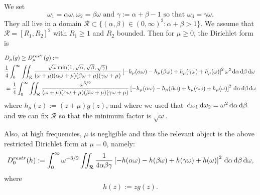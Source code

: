 \documentclass[reqno,11pt,letterpaper]{amsart}
\numberwithin{equation}{section}
\newcommand{\dd}{\, {\rm d}}
\begin{document}
We set $$\omega_1=\alpha \omega, \omega_2=\beta \omega \text{ and } \gamma:=\alpha+\beta-1 \text{ so that } \omega_3=\gamma \omega.$$  They all live in a domain  $\mathcal{R} \subset \{(\alpha,\beta) \in (0,\infty)^2: \alpha+\beta>1\}$. We assume that $\mathcal{R} = [R_1,R_2]^2$ with $R_1\geq 1$ and $R_2$ bounded. 
Then for $\mu\geq 0$, the Dirichlet form is 

\begin{equation}
    \begin{split}
    &D_\mu(g) \geq  D_\mu^{restr}(g) := \\
    & \frac{1}{4} \int_0^\infty \iint_{\mathcal{R}} \frac{\sqrt{\omega} \min(1,\sqrt{\alpha}, \sqrt{\beta},\sqrt{\gamma}) }{(\omega+\mu)(\alpha\omega+\mu)(\beta\omega+\mu)(\gamma\omega+\mu)}\left[- h_\mu(\alpha \omega) - h_\mu(\beta \omega) + h_\mu(\gamma \omega) + h_\mu(\omega)\right]^2 \omega^2\dd \alpha \dd \beta  \dd \omega 
    \\
    & = \frac{1}{4} \int_0^\infty \iint_{\mathcal{R}} \frac{\omega^{5/2}}{(\omega+\mu)(\alpha\omega+\mu)(\beta\omega+\mu)(\gamma\omega+\mu)}\left[- h_\mu(\alpha \omega) - h_\mu(\beta \omega) + h_\mu(\gamma \omega) + h_\mu(\omega)\right]^2 \dd \alpha \dd \beta  \dd \omega
    \end{split}
\end{equation}
where $h_\mu(z):=(z+\mu) g(z)$, and where we used that 
 $\dd\omega_1\dd\omega_2 = \omega^2 \dd \alpha \dd \beta$ and we can fix $\mathcal{R}$ so that the minimum factor is $\sqrt{\omega}$.

Also, at high frequencies, $\mu$ is negligible and thus the relevant object is the above restricted Dirichlet form at $\mu=0$, namely: 
$$ D_0^{restr}(h):= 
\int_0^\infty  \omega^{-3/2} \iint_{\mathcal{R}}  \frac{1}{4\alpha\beta\gamma} \left[- h(\alpha \omega) - h(\beta \omega) + h(\gamma \omega) + h(\omega) \right]^2  \dd \alpha \dd \beta \dd \omega, $$
where $$h(z):=zg(z).$$
\end{document}
